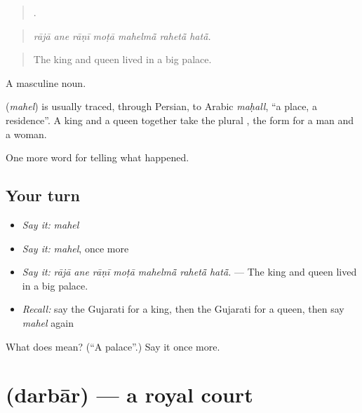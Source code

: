 \begin{quote}
      .
\end{quote}

\begin{quote}
\emph{rājā ane rāṇī moṭā mahelmā̃ rahetā̃ hatā̃.}
\end{quote}

\begin{quote}
The king and queen lived in a big palace.
\end{quote}

A masculine noun.

\begin{cousinweb}
\textbf{} (\emph{mahel}) is usually traced, through Persian, to Arabic \emph{maḥall}, \textquotedblleft{}a place, a residence\textquotedblright{}. A king and a queen together take the plural \textbf{ }, the form for a man and a woman.
\end{cousinweb}

\begin{grammarlens}[title={What you've built}]
One more word for telling what happened.
\end{grammarlens}

\subsection*{Your turn}
\begin{itemize}
\raggedright
  \item \emph{Say it:} \emph{mahel}
  \item \emph{Say it:} \emph{mahel}, once more
  \item \emph{Say it:} \emph{rājā ane rāṇī moṭā mahelmā̃ rahetā̃ hatā̃.} — The king and queen lived in a big palace.
  \item \emph{Recall:} say the Gujarati for a king, then the Gujarati for a queen, then say \emph{mahel} again
\end{itemize}

\begin{tcolorbox}[breakable,colback=teal!4,colframe=teal!35!black,title={Before you move on}]
What does  mean? (\textquotedblleft{}A palace\textquotedblright{}.) Say it once more.
\end{tcolorbox}
\section[\texorpdfstring{\gu{દરબાર} (darbār)}{દરબાર (darbār)}]{ (darbār) — a royal court}

